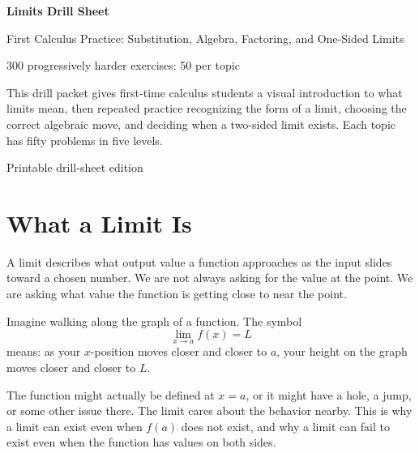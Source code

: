 \documentclass[11pt,oneside]{book}
\newenvironment{rulebox}[1]{\par\medskip\noindent{\color{navy}\bfseries #1}\par\noindent{\color{navy}\hrule}\smallskip}{\par\smallskip\noindent{\color{navy}\hrule}\par\medskip}
\begin{document}
\frontmatter
\begin{titlepage}
\centering
\vspace*{0.8in}
{\Huge\bfseries Limits Drill Sheet\par}
\vspace{0.25in}
{\LARGE First Calculus Practice: Substitution, Algebra, Factoring, and One-Sided Limits\par}
\vspace{0.45in}
{\Large 300 progressively harder exercises: 50 per topic\par}
\vfill
\begin{rulebox}{Purpose}
This drill packet gives first-time calculus students a visual introduction to what limits mean, then repeated practice recognizing the form of a limit, choosing the correct algebraic move, and deciding when a two-sided limit exists. Each topic has fifty problems in five levels.
\end{rulebox}
\vfill
{\large Printable drill-sheet edition\par}
\end{titlepage}
\tableofcontents
\chapter*{What a Limit Is}
\begin{rulebox}{Main idea}
A limit describes what output value a function approaches as the input slides toward a chosen number. We are not always asking for the value at the point. We are asking what value the function is getting close to near the point.
\end{rulebox}

Imagine walking along the graph of a function. The symbol
\[
\lim_{x\to a} f(x)=L
\]
means: as your $x$-position moves closer and closer to $a$, your height on the graph moves closer and closer to $L$.

The function might actually be defined at $x=a$, or it might have a hole, a jump, or some other issue there. The limit cares about the behavior nearby. This is why a limit can exist even when $f(a)$ does not exist, and why a limit can fail to exist even when the function has values on both sides.
\end{document}
